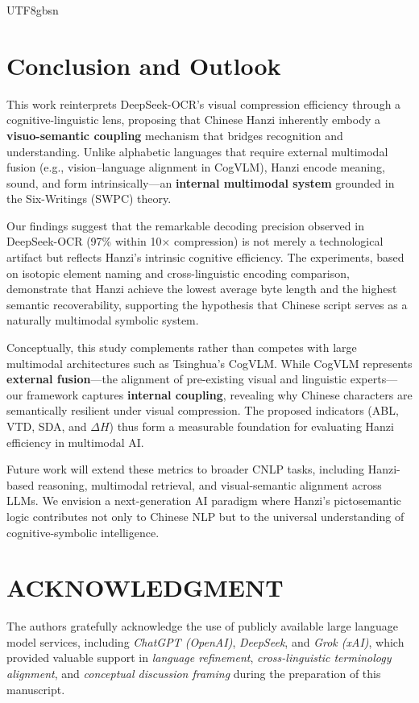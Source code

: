 \documentclass[conference]{IEEEtran}
\begin{document}
\begin{CJK*}{UTF8}{gbsn}
\vspace{0.1cm}
\section{Conclusion and Outlook}

This work reinterprets DeepSeek-OCR’s visual compression efficiency through a cognitive-linguistic lens, proposing that Chinese Hanzi inherently embody a \textbf{visuo-semantic coupling} mechanism that bridges recognition and understanding. Unlike alphabetic languages that require external multimodal fusion (e.g., vision–language alignment in CogVLM), Hanzi encode meaning, sound, and form intrinsically—an \textbf{internal multimodal system} grounded in the Six-Writings (SWPC) theory.

Our findings suggest that the remarkable decoding precision observed in DeepSeek-OCR (97\% within 10× compression) is not merely a technological artifact but reflects Hanzi’s intrinsic cognitive efficiency. The experiments, based on isotopic element naming and cross-linguistic encoding comparison, demonstrate that Hanzi achieve the lowest average byte length and the highest semantic recoverability, supporting the hypothesis that Chinese script serves as a naturally multimodal symbolic system.

Conceptually, this study complements rather than competes with large multimodal architectures such as Tsinghua’s CogVLM. While CogVLM represents \textbf{external fusion}—the alignment of pre-existing visual and linguistic experts—our framework captures \textbf{internal coupling}, revealing why Chinese characters are semantically resilient under visual compression. The proposed indicators (ABL, VTD, SDA, and $\Delta H$) thus form a measurable foundation for evaluating Hanzi efficiency in multimodal AI.

Future work will extend these metrics to broader CNLP tasks, including Hanzi-based reasoning, multimodal retrieval, and visual-semantic alignment across LLMs. We envision a next-generation AI paradigm where Hanzi’s pictosemantic logic contributes not only to Chinese NLP but to the universal understanding of cognitive-symbolic intelligence.

\section*{ACKNOWLEDGMENT}
The authors gratefully acknowledge the use of publicly available large language model services, including \textit{ChatGPT (OpenAI)}, \textit{DeepSeek}, and \textit{Grok (xAI)}, which provided valuable support in \textit{language refinement}, \textit{cross-linguistic terminology alignment}, and \textit{conceptual discussion framing} during the preparation of this manuscript. 



\end{CJK*}
\end{document}
